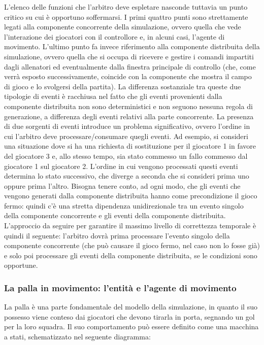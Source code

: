 L'elenco delle funzioni che l'arbitro deve espletare nasconde tuttavia un punto critico su cui è opportuno soffermarsi. I primi quattro punti sono strettamente legati alla componente concorrente della simulazione, ovvero quella che vede l'interazione dei giocatori con il controllore e, in alcuni casi, l'agente di movimento. L'ultimo punto fa invece riferimento alla componente distribuita della simulazione, ovvero quella che si occupa di ricevere e gestire i comandi impartiti dagli allenatori ed eventualmente dalla finestra principale di controllo (che, come verrà esposto successivamente, coincide con la componente che mostra il campo di gioco e lo svolgersi della partita). La differenza sostanziale tra queste due tipologie di eventi è racchiusa nel fatto che gli eventi provenienti dalla componente distribuita non sono deterministici e non seguono nessuna regola di generazione, a differenza degli eventi relativi alla parte concorrente.
La presenza di due sorgenti di eventi introduce un problema significativo, ovvero l'ordine in cui l'arbitro deve processare/consumare quegli eventi. Ad esempio, si consideri una situazione dove si ha una richiesta di sostituzione per il giocatore 1 in favore del giocatore 3 e, allo stesso tempo, sia stato commesso un fallo commesso dal giocatore 1 sul giocatore 2. L'ordine in cui vengono processati questi eventi determina lo stato successivo, che diverge a seconda che si consideri prima uno oppure prima l'altro. Bisogna tenere conto, ad ogni modo, che gli eventi che vengono generati dalla componente distribuita hanno come precondizione il gioco fermo: quindi c'è una stretta dipendenza unidirezionale tra un evento singolo della componente concorrente e gli eventi della componente distribuita. L'approccio da seguire per garantire il massimo livello di correttezza temporale è quindi il seguente: l'arbitro dovrà prima processare l'evento singolo della componente concorrente (che può causare il gioco fermo, nel caso non lo fosse già) e solo poi processare gli eventi della componente distribuita, se le condizioni sono opportune.

\subsubsection{La palla in movimento: l'entità e l'agente di movimento}
\label{sec:modello_palla_agente_movimento}


La palla è una parte fondamentale del modello della simulazione, in quanto il suo possesso viene conteso dai giocatori che devono tirarla in porta, segnando un gol per la loro squadra. Il suo comportamento può essere definito come una macchina a stati, schematizzato nel seguente diagramma:

